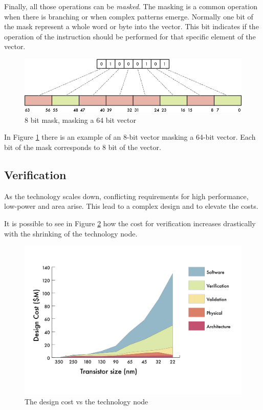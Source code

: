 Finally, all those operations can be \textit{masked}. The masking is a common operation when there is branching or when complex patterns emerge.
Normally one bit of the mask represent a whole word or byte into the vector. This bit indicates if the operation of the instruction should be performed for that specific element of the vector.


\begin{figure}[H]
    \centering
    \includegraphics[scale = 0.9]{Chapter_1/img/masking.png}
    \caption{8 bit mask, masking a 64 bit vector}
    \label{masking}
\end{figure}

In Figure \ref{masking} there is an example of an 8-bit vector masking a 64-bit vector. Each bit of the mask corresponds to 8 bit of the vector.

\subsection{Verification}
As the technology scales down, conflicting requirements for high performance, low-power and area arise. 
This lead to a complex design and to elevate the costs.

It is possible to see in Figure \ref{verification-tecnology} how the cost for verification increases drastically with the shrinking of the technology node.


\begin{figure}[H]
    \centering
    \includegraphics[scale = 0.4]{Chapter_1/img/cost-scale.png}
    \caption{The design cost vs the technology node \cite{verification-book-2018}}
    \label{verification-tecnology}
\end{figure}

